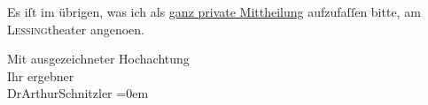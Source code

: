 \pstart
           Es iſt im übrigen, was ich als \uline{ganz private
                  Mittheilung} aufzufaſſen bitte, am \textsc{Lessing}theater angeno{\geminationm}en.\pend
           
\pstart
           Mit ausgezeichneter Hochachtung{\\[\baselineskip]}Ihr ergebner{\\[\baselineskip]}\spacefill\mbox{DrArthurSchnitzler}\pend
           \leftskip=0em{}\endnumbering{}  \newcommand{\dateiname}{L00055}\newcommand{\titel}{Arthur Schnitzler an Wilhelm Bölsche, 19. 12. 1891}\newcommand{\editorInnen}{Martin Anton Müller und Gerd-Hermann Susen}
